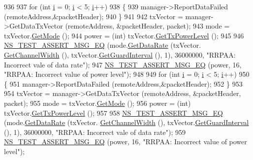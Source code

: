 \begin{DoxyCode}
936 
937   \textcolor{keywordflow}{for} (\textcolor{keywordtype}{int} \hyperlink{bernuolliDistribution_8m_a6f6ccfcf58b31cb6412107d9d5281426}{i} = 0; \hyperlink{bernuolliDistribution_8m_a6f6ccfcf58b31cb6412107d9d5281426}{i} < 5; \hyperlink{bernuolliDistribution_8m_a6f6ccfcf58b31cb6412107d9d5281426}{i}++)
938     \{
939       manager->ReportDataFailed (remoteAddress,&packetHeader);
940     \}
941 
942   txVector = manager->GetDataTxVector (remoteAddress, &packetHeader, packet);
943   mode = txVector.\hyperlink{classns3_1_1WifiTxVector_a497b1f11cad4b8b26251dfa07c9ad1d6}{GetMode} ();
944   power = (int) txVector.\hyperlink{classns3_1_1WifiTxVector_a7c98bd9609ff1c5cefa6e22d6908a2fe}{GetTxPowerLevel} ();
945 
946   \hyperlink{group__testing_ga2a9d78cffb3db8e867c35fff0b698cf5}{NS\_TEST\_ASSERT\_MSG\_EQ} (mode.\hyperlink{classns3_1_1WifiMode_adcfbe150f69da720db23387f733b8a52}{GetDataRate} (txVector.
      \hyperlink{classns3_1_1WifiTxVector_a1f8bfa51778a3e217581eb665f059564}{GetChannelWidth} (), txVector.\hyperlink{classns3_1_1WifiTxVector_ab80c0fd812542ef337a6cace4f64db63}{GetGuardInterval} (), 1), 36000000, \textcolor{stringliteral}{"RRPAA:
       Incorrect vale of data rate"});
947   \hyperlink{group__testing_ga2a9d78cffb3db8e867c35fff0b698cf5}{NS\_TEST\_ASSERT\_MSG\_EQ} (power, 16, \textcolor{stringliteral}{"RRPAA: Incorrect value of power level"});
948 
949   \textcolor{keywordflow}{for} (\textcolor{keywordtype}{int} \hyperlink{bernuolliDistribution_8m_a6f6ccfcf58b31cb6412107d9d5281426}{i} = 0; \hyperlink{bernuolliDistribution_8m_a6f6ccfcf58b31cb6412107d9d5281426}{i} < 5; \hyperlink{bernuolliDistribution_8m_a6f6ccfcf58b31cb6412107d9d5281426}{i}++)
950     \{
951       manager->ReportDataFailed (remoteAddress,&packetHeader);
952     \}
953 
954   txVector = manager->GetDataTxVector (remoteAddress, &packetHeader, packet);
955   mode = txVector.\hyperlink{classns3_1_1WifiTxVector_a497b1f11cad4b8b26251dfa07c9ad1d6}{GetMode} ();
956   power = (int) txVector.\hyperlink{classns3_1_1WifiTxVector_a7c98bd9609ff1c5cefa6e22d6908a2fe}{GetTxPowerLevel} ();
957 
958   \hyperlink{group__testing_ga2a9d78cffb3db8e867c35fff0b698cf5}{NS\_TEST\_ASSERT\_MSG\_EQ} (mode.\hyperlink{classns3_1_1WifiMode_adcfbe150f69da720db23387f733b8a52}{GetDataRate} (txVector.
      \hyperlink{classns3_1_1WifiTxVector_a1f8bfa51778a3e217581eb665f059564}{GetChannelWidth} (), txVector.\hyperlink{classns3_1_1WifiTxVector_ab80c0fd812542ef337a6cace4f64db63}{GetGuardInterval} (), 1), 36000000, \textcolor{stringliteral}{"RRPAA:
       Incorrect vale of data rate"});
959   \hyperlink{group__testing_ga2a9d78cffb3db8e867c35fff0b698cf5}{NS\_TEST\_ASSERT\_MSG\_EQ} (power, 16, \textcolor{stringliteral}{"RRPAA: Incorrect value of power level"});

\end{DoxyCode}
